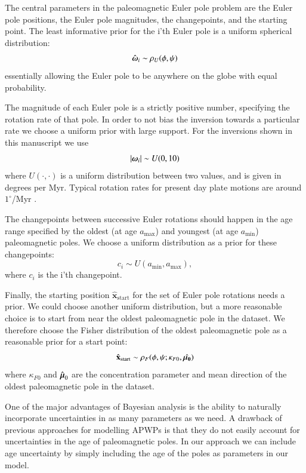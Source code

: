 \documentclass[preprint,12pt,authoryear]{elsarticle}
\newcommand{\mitbf}[1]{\hbox{\mathversion{bold}$#1$}}
\begin{document}
The central parameters in the paleomagnetic Euler pole problem are the Euler pole positions,
the Euler pole magnitudes, the changepoints, and the starting point. 
The least informative prior for the i'th Euler pole is a uniform spherical distribution:
\begin{equation}
\hat{\mitbf{\omega}}_i \sim \rho_U(\phi, \psi)
\end{equation}
essentially allowing the Euler pole to be anywhere on the globe with equal probability.

The magnitude of each Euler pole is a strictly positive number, specifying the
rotation rate of that pole. In order to not bias the inversion towards a particular
rate we choose a uniform prior with large support. For the inversions shown in
this manuscript we use
\begin{equation}
\vert \mitbf{\omega}_i \vert \sim U(0, 10)
\end{equation}
where $U(\cdot, \cdot)$ is a uniform distribution between two values, and is given
in degrees per Myr. Typical rotation rates for present day plate motions
are around $1^\circ$/Myr \citep{argus2011geologically}.

The changepoints between successive Euler rotations should happen in the age
range specified by the oldest (at age $a_\mathrm{max}$) and youngest (at age $a_\mathrm{min}$)
paleomagnetic poles. We choose a uniform distribution as a prior for these changepoints:
\begin{equation}
c_i \sim U( a_\mathrm{min}, a_\mathrm{max}),
\end{equation}
where $c_i$ is the i'th changepoint.

Finally, the starting position $\hat{\mathbf{x}}_\mathrm{start}$ for the set of Euler pole rotations needs a prior.
We could choose another uniform distribution, but a more reasonable choice
is to start from near the oldest paleomagnetic pole in the dataset.
We therefore choose the Fisher distribution of the oldest paleomagnetic pole as a reasonable prior for a start point:
\begin{equation}
\hat{\mathbf{x}}_\mathrm{start} \sim \rho_F(\phi, \psi; \kappa_{F0}, \hat{\mitbf{\mu_0}})
\end{equation}
where $\kappa_{F0}$ and $\hat{\mitbf{\mu}}_0$ are the concentration parameter and mean direction
of the oldest paleomagnetic pole in the dataset.

One of the major advantages of Bayesian analysis is the ability to naturally incorporate
uncertainties in as many parameters as we need. A drawback of previous approaches
for modelling APWPs is that they do not easily account for uncertainties in
the age of paleomagnetic poles. In our approach we can include age uncertainty
by simply including the age of the poles as parameters in our model.
\end{document}
